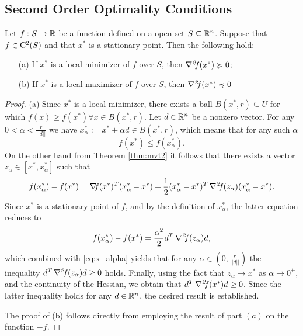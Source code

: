 \documentclass[10pt,a4paper]{article}
\begin{document}
\subsection{Second Order Optimality Conditions}
\begin{theorem}\label{thm:second_order_optimality}
	Let $f:S\to \mathbb{R}$ be a function defined on a open set $S\subseteq \mathbb{R}^n$. Suppose that $f\in\mathord{\mathrm{C^2}}(S)$ and that $x^*$ is a stationary point. Then the following hold:
\begin{itemize}
	\item[(a)] If $x^*$ is a local minimizer of $f$ over $S$, then $\operatorname*{\mathit{\nabla^2 \!f}} (x^*)\succcurlyeq 0$;
	\item[(b)] If $x^*$ is a local maximizer of $f$ over $S$, then $\operatorname*{\mathit{\nabla^2 \!f}} (x^*)\preccurlyeq 0$ 	
\end{itemize}
\end{theorem}
\begin{proof}
	(a) Since $x^*$ is a local minimizer, there exists a ball $B(x^*,r)\subseteq U$ for which $f(x) \geq f(x^*) \forall x\in B(x^*,r)$. Let $d\in \mathbb{R}^n$ be a nonzero vector. For any $0<\alpha<\frac{r}{||d||}$ we have $x_\alpha^* :=x^* + \alpha d \in B(x^*, r)$, which means that for any such $\alpha$
	\begin{equation}\label{eq:x_alpha}
		f(x^*)\leq f(x_\alpha^*).
	\end{equation}
On the other hand from Theorem \ref{thm:mvt2} it follows that there exists a vector $z_\alpha \in [x^*,x_\alpha^*]$ such that 
\begin{equation*}
	f(x_\alpha^*)- f(x^*) =\operatorname*{\mathit{\nabla \!f}} (x^*)^T(x_\alpha^*-x^*) +\frac{1}{2}(x_\alpha^*-x^*)^T\operatorname*{\mathit{\nabla^2 \!f}}(z_\alpha)(x_\alpha^*-x^*).
\end{equation*}
Since $x^*$ is a stationary point of $f$, and by the definition of $x_\alpha^*$, the latter equation reduces to 
\begin{equation*}
	f(x_\alpha^*)- f(x^*) = \frac{\alpha^2}{2} d^T\operatorname*{\mathit{\nabla^2 \!f}}(z_\alpha) d,
\end{equation*}
which combined with \eqref{eq:x_alpha} yields that for any $\alpha \in (0, \frac{r}{||d||})$ the inequality $d^T \operatorname*{\mathit{\nabla^2 \!f}}(z_\alpha) d\geq 0$ holds. Finally, using the fact that $z_\alpha \to x^*$ as $\alpha\to 0^+$, and the continuity of the Hessian, we obtain that $d^T \operatorname*{\mathit{\nabla^2 \!f}}(x^*) d\geq 0$. Since the latter inequality holds for any $d \in\mathbb{R}^n$, the desired result is established. 
\par The proof of (b) follows directly from employing the result of part $(a)$ on the function $-f$.
\end{proof}
\end{document}
